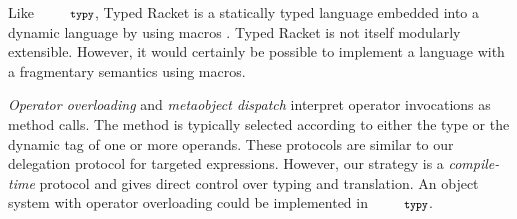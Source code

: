\documentclass[10pt]{sigplanconf}
\newcommand{\typy}{\texttt{\footnotesize typy}}
\begin{document}
Like $\typy$, Typed Racket is a statically typed language embedded into a dynamic language by using macros \cite{TypedScheme2008,culpepper2007advanced}. Typed Racket is not itself modularly extensible. However, it would certainly be possible to implement a language with a fragmentary semantics using macros.

{\it Operator overloading} \cite{vanWijngaarden:Mailloux:Peck:Koster:Sintzoff:Lindsey:Meertens:Fisker:acta:1975} and {\it metaobject dispatch} \cite{Kiczales91} interpret operator invocations as method calls. The method is typically selected according to either the type or the dynamic tag of one or more operands. These protocols are similar to our delegation protocol for targeted expressions. However, our strategy is a {\it compile-time} protocol and gives direct control over typing and translation. An object system with  operator overloading could be implemented in $\typy$. %




\end{document}
